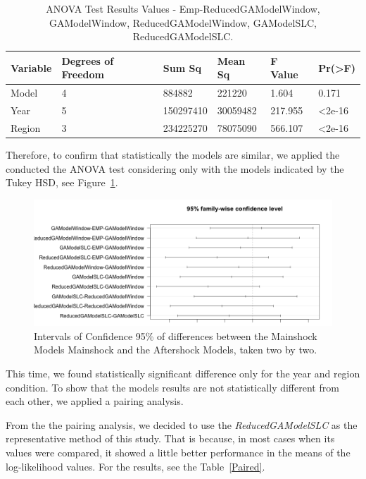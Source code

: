 \begin{table}[!htb]
	\centering
	\begin{tabular}{|l|l|l|l|l|l|}
		\hline
		{Variable} & {Degrees of Freedom} & {Sum Sq}    & {Mean Sq}   & {F Value} & {Pr(\textgreater F)} \\
		\hline
		Model    & 4           	  & 884882  & 221220   & 1.604    & 0.171    \\
		\hline
		Year     & 5                 & 150297410  & 30059482  & 217.955   & \textless2e-16     \\
		\hline
		Region   & 3                  & 234225270  & 78075090  & 566.107   & \textless2e-16	\\    
		\hline
	\end{tabular}
	\caption{ANOVA Test Results Values - Emp-ReducedGAModelWindow, GAModelWindow, ReducedGAModelWindow, GAModelSLC, ReducedGAModelSLC.}
	\label{anovatest2}
\end{table}

Therefore, to confirm that statistically the models are similar, we applied the conducted the ANOVA test considering only with the models indicated by the Tukey HSD, see Figure~\ref{modelANOVA-100and5}.

\begin{figure}[H]
	\centering
	\includegraphics[scale=0.28]{img/modelANOVA-100and5.png}
	\caption{Intervals of Confidence 95\% of differences between the Mainshock Models Mainshock and the Aftershock Models, taken two by two.}
		\label{modelANOVA-100and5}
\end{figure}

This time, we found statistically significant difference only for the year and region condition. To show that the models results are not statistically different from each other, we applied a pairing analysis.

From the the pairing analysis, we decided to use the \textit{ReducedGAModelSLC} as the representative method of this study. That is because, in most cases when its values were compared, it showed a little better performance in the means of the log-likelihood values. For the results, see the Table~\ref{Paired}.


